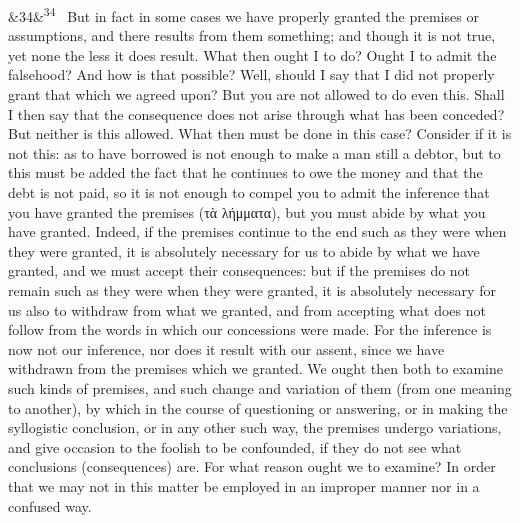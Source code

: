 \documentclass[12pt]{article}
\newcommand{\para}[1][]{\par\noindent\ifx&#1&\else\textsuperscript{\footnotesize #1}~\fi}
\begin{document}
\para[34] But in fact in some cases we have properly granted the premises or assumptions, and there results from them something; and though it is not true, yet none the less it does result. What then ought I to do? Ought I to admit the falsehood? And how is that possible? Well, should I say that I did not properly grant that which we agreed upon? But you are not allowed to do even this. Shall I then say that the consequence does not arise through what has been conceded? But neither is this allowed. What then must be done in this case? Consider if it is not this: as to have borrowed is not enough to make a man still a debtor, but to this must be added the fact that he continues to owe the money and that the debt is not paid, so it is not enough to compel you to admit the inference that you have granted the premises (τὰ λήμματα), but you must abide by what you have granted. Indeed, if the premises continue to the end such as they were when they were granted, it is absolutely necessary for us to abide by what we have granted, and we must accept their consequences: but if the premises do not remain such as they were when they were granted, it is absolutely necessary for us also to withdraw from what we granted, and from accepting what does not follow from the words in which our concessions were made. For the inference is now not our inference, nor does it result with our assent, since we have withdrawn from the premises which we granted. We ought then both to examine such kinds of premises, and such change and variation of them (from one meaning to another), by which in the course of questioning or answering, or in making the syllogistic conclusion, or in any other such way, the premises undergo variations, and give occasion to the foolish to be confounded, if they do not see what conclusions (consequences) are. For what reason ought we to examine? In order that we may not in this matter be employed in an improper manner nor in a confused way.
\end{document}
